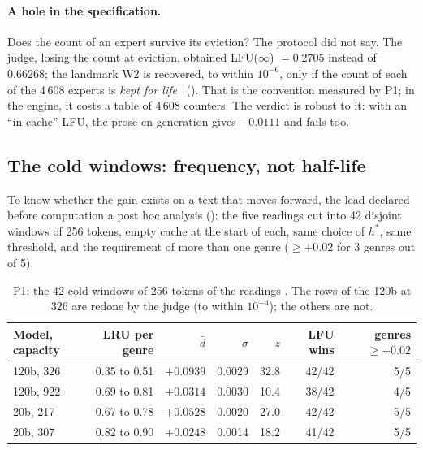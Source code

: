 \paragraph{A hole in the specification.} Does the count of an expert survive its eviction? The protocol did not say. The judge, losing the count at eviction, obtained LFU($\infty$) $= 0.2705$ instead of 0.66268; the landmark W2 is recovered, to within $10^{-6}$, only if the count of each of the 4\,608 experts is \emph{kept for life} \mes~(). That is the convention measured by P1; in the engine, it costs a table of 4\,608 counters. The verdict is robust to it: with an ``in-cache'' LFU, the prose-en generation gives $-0.0111$ and fails too.

\subsection{The cold windows: frequency, not half-life}\label{t3mim:sec:p1-fenetres}

To know whether the gain exists on a text that moves forward, the lead declared before computation a post hoc analysis (): the five readings cut into 42 disjoint windows of 256 tokens, empty cache at the start of each, same choice of $h^\ast$, same threshold, and the requirement of more than one genre ($\ge +0.02$ for 3 genres out of 5).

\begin{table}[tbp]
\centering\small
\caption[P1: the cold windows of 256 tokens]{P1: the 42 cold windows of 256 tokens of the readings \mes. The rows of the 120b at 326 are redone by the judge (to within $10^{-4}$); the others are not.}
\label{t3mim:tab:p1-fenetres}
\begin{tabular}{@{}lrrrrrr@{}}
\toprule
Model, capacity & LRU per genre & $\bar d$ & $\sigma$ & $z$ & LFU wins & genres $\ge +0.02$ \\
\midrule
120b, 326 & 0.35 to 0.51 & $+0.0939$ & 0.0029 & 32.8 & 42/42 & 5/5 \\
120b, 922 & 0.69 to 0.81 & $+0.0314$ & 0.0030 & 10.4 & 38/42 & 4/5 \\
20b, 217 & 0.67 to 0.78 & $+0.0528$ & 0.0020 & 27.0 & 42/42 & 5/5 \\
20b, 307 & 0.82 to 0.90 & $+0.0248$ & 0.0014 & 18.2 & 41/42 & 5/5 \\
\bottomrule
\end{tabular}
\end{table}

